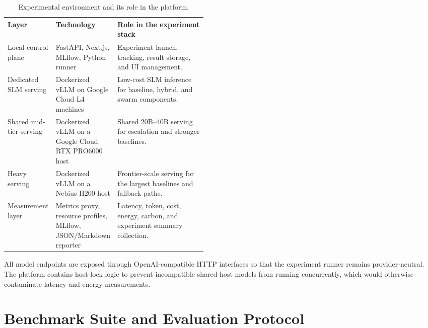 \begin{table}[htbp]
    \centering
    \caption{Experimental environment and its role in the platform.}
    \label{tab:environment-matrix}
    \small
    \renewcommand{\arraystretch}{1.15}
    \begin{tabularx}{\linewidth}{@{} >{\raggedright\arraybackslash}p{0.21\linewidth} >{\raggedright\arraybackslash}p{0.25\linewidth} >{\raggedright\arraybackslash}X @{}}
        \toprule
        \textbf{Layer} & \textbf{Technology} & \textbf{Role in the experiment stack} \\
        \midrule
        Local control plane & FastAPI, Next.js, MLflow, Python runner & Experiment launch, tracking, result storage, and UI management. \\
        Dedicated SLM serving & Dockerized vLLM on Google Cloud L4 machines & Low-cost SLM inference for baseline, hybrid, and swarm components. \\
        Shared mid-tier serving & Dockerized vLLM on a Google Cloud RTX PRO6000 host & Shared 20B--40B serving for escalation and stronger baselines. \\
        Heavy serving & Dockerized vLLM on a Nebius H200 host & Frontier-scale serving for the largest baselines and fallback paths. \\
        Measurement layer & Metrics proxy, resource profiles, MLflow, JSON/Markdown reporter & Latency, token, cost, energy, carbon, and experiment summary collection. \\
        \bottomrule
    \end{tabularx}
\end{table}

All model endpoints are exposed through OpenAI-compatible HTTP interfaces so that the experiment runner remains provider-neutral. The platform contains host-lock logic to prevent incompatible shared-host models from running concurrently, which would otherwise contaminate latency and energy measurements.

\section{Benchmark Suite and Evaluation Protocol}
\label{sec:bench-suite}

